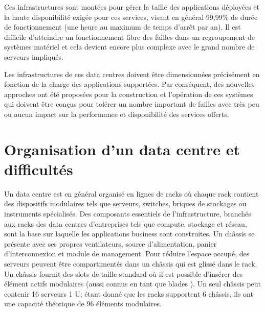 Ces infrastructures sont montées pour gérer la taille des applications déployées et la haute disponibilité exigée pour ces services, visant en général 99,99\% de durée de fonctionnement (une heure au maximum de temps d'arrêt par an). Il est difficile d'atteindre un fonctionnement libre des failles dans un regroupement de systèmes matériel et cela devient encore plus complexe avec le grand nombre de serveurs impliqués.

\par
Les infrastructures de ces data centres doivent être dimensionnées précisément  en fonction de la charge des applications supportées. Par conséquent, des nouvelles approches ont été proposées pour la construction et l'opération de ces systèmes qui doivent être conçus pour tolérer un nombre important de failles avec très peu ou aucun impact sur la performance et disponibilité des services offerts. \cite{understandingCloudWhatDC}  \cite{datacenterAsComputerIntro}

\section{Organisation d'un data centre et difficultés}

Un data centre est en général organisé en lignes de racks où chaque rack contient des dispositifs modulaires tels que serveurs, switches, briques de stockages ou instruments spécialisés. %
Des composants essentiels de l'infrastructure, branchés aux racks des data centres d'entreprises tels que compute, stockage et réseau, sont la base sur laquelle les applications business sont construites. Un châssis se présente avec ses propres ventilateurs, source d'alimentation, panier d'interconnexion et module de management. 
Pour réduire l'espace occupé, des serveurs peuvent être compartimentés dans un châssis qui est glissé dans le rack. Un châssis fournit des slots de taille standard où il est possible d'insérer des élément actifs modulaires (aussi connus en tant que \og blades \fg{}). Un seul châssis peut contenir 16 serveurs 1 U; étant donné que les racks supportent 6 châssis, ils ont une capacité théorique de 96 éléments modulaires.



